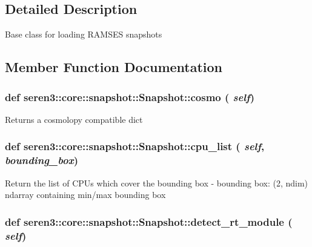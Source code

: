 \subsection{Detailed Description}
\begin{DoxyVerb}
Base class for loading RAMSES snapshots
\end{DoxyVerb}
 

\subsection{Member Function Documentation}
\hypertarget{classseren3_1_1core_1_1snapshot_1_1Snapshot_a37795f257754bd55b3b7cccb670b5427}{
\subsubsection[{cosmo}]{\setlength{\rightskip}{0pt plus 5cm}def seren3::core::snapshot::Snapshot::cosmo ( {\em self})}}
\label{classseren3_1_1core_1_1snapshot_1_1Snapshot_a37795f257754bd55b3b7cccb670b5427}
\begin{DoxyVerb}
Returns a cosmolopy compatible dict
\end{DoxyVerb}
 \hypertarget{classseren3_1_1core_1_1snapshot_1_1Snapshot_a3ed00acb1c37af725387b56ca9399e05}{
\subsubsection[{cpu\_\-list}]{\setlength{\rightskip}{0pt plus 5cm}def seren3::core::snapshot::Snapshot::cpu\_\-list ( {\em self}, \/   {\em bounding\_\-box})}}
\label{classseren3_1_1core_1_1snapshot_1_1Snapshot_a3ed00acb1c37af725387b56ca9399e05}
\begin{DoxyVerb}
Return the list of CPUs which cover the bounding box
- bounding box: (2, ndim) ndarray containing min/max bounding box
\end{DoxyVerb}
 \hypertarget{classseren3_1_1core_1_1snapshot_1_1Snapshot_a51e47a3904099f9ae123f172651aeafa}{
\subsubsection[{detect\_\-rt\_\-module}]{\setlength{\rightskip}{0pt plus 5cm}def seren3::core::snapshot::Snapshot::detect\_\-rt\_\-module ( {\em self})}}
